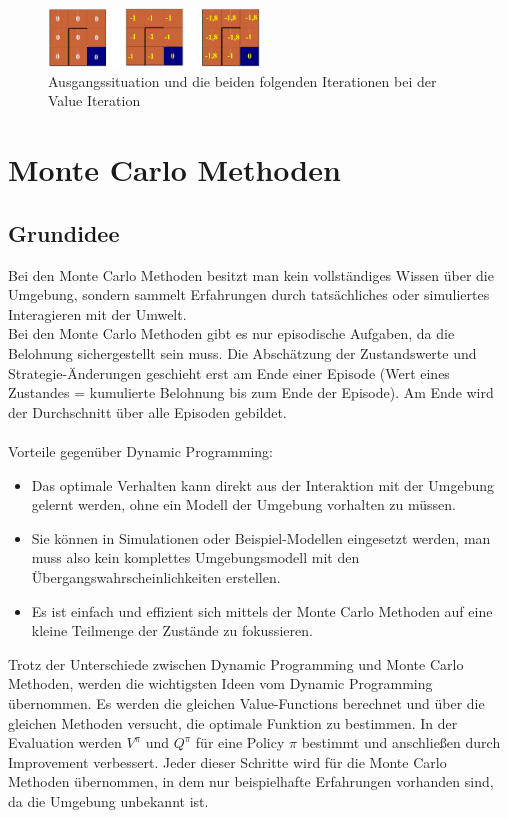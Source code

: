 \documentclass[10pt]{scrartcl}
\begin{document}
\begin{figure}[htbp]
	\centering	\includegraphics[width=0.5\textwidth]{Bilder/ValueIterationAufgabe}
	\caption{Ausgangssituation und die beiden folgenden Iterationen bei der Value Iteration}
	\label{fig:value_aufgabe}
\end{figure}


\section{Monte Carlo Methoden}
\label{sec:monteCarloMethoden}

\subsection{Grundidee}
Bei den Monte Carlo Methoden besitzt man kein vollständiges Wissen über die Umgebung, sondern sammelt Erfahrungen durch tatsächliches oder simuliertes Interagieren mit der Umwelt.\\
Bei den Monte Carlo Methoden gibt es nur episodische Aufgaben, da die Belohnung sichergestellt sein muss. Die Abschätzung der Zustandswerte und Strategie-Änderungen geschieht erst am Ende einer Episode (Wert eines Zustandes = kumulierte Belohnung bis zum Ende der Episode). Am Ende wird der Durchschnitt über alle Episoden gebildet.\\
\\
Vorteile gegenüber Dynamic Programming:
\begin{itemize}
\item{Das optimale Verhalten kann direkt aus der Interaktion mit der Umgebung gelernt werden, ohne ein Modell der Umgebung vorhalten zu müssen.}
\item{Sie können in Simulationen oder Beispiel-Modellen eingesetzt werden, man muss also kein komplettes Umgebungsmodell mit den Übergangswahrscheinlichkeiten erstellen.}
\item{Es ist einfach und effizient sich mittels der Monte Carlo Methoden auf eine kleine Teilmenge der Zustände zu fokussieren.}
\end{itemize}

Trotz der Unterschiede zwischen Dynamic Programming und Monte Carlo Methoden, werden die wichtigsten Ideen vom Dynamic Programming übernommen. Es werden die gleichen Value-Functions berechnet und über die gleichen Methoden versucht, die optimale Funktion zu bestimmen. In der Evaluation werden $V^{\pi}$ und $Q^{\pi}$ für eine Policy $\pi$ bestimmt und anschließen durch Improvement verbessert. Jeder dieser Schritte wird für die Monte Carlo Methoden übernommen, in dem nur beispielhafte Erfahrungen vorhanden sind, da die Umgebung unbekannt ist.
\end{document}

